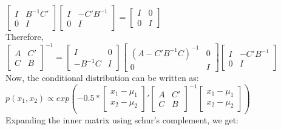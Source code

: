 \begin{enumerate}
{	$\begin{bmatrix}
	I & B^{-1}C' \\
	0 & I
	\end{bmatrix}
	\begin{bmatrix}
	I & -C'B^{-1} \\
	0 & I
	\end{bmatrix} =
	\begin{bmatrix}
	I & 0 \\
	0 & I
	\end{bmatrix}$\\

	Therefore, \\
	
	$\begin{bmatrix}
	A & C' \\
	C & B
	\end{bmatrix}^{-1}
	=
	\begin{bmatrix}
	I & 0 \\
	-B^{-1}C & I
	\end{bmatrix}
	\begin{bmatrix}
	(A - C'B^{-1}C)^{-1} & 0 \\
	0 & I
	\end{bmatrix}
	\begin{bmatrix}
	I & -C'B^{-1} \\
	0 & I
	\end{bmatrix}$\\

	Now, the conditional distribution can be written as:\\
	
	$p(x_{1}, x_{2}) \propto exp( -0.5 * 
	\begin{bmatrix}
	x_{1} - \mu_{1} \\
	x_{2} - \mu_{2} 
	\end{bmatrix}'
	\begin{bmatrix}
	A & C' \\
	C & B   
	\end{bmatrix}^{-1} 
	\begin{bmatrix}
	x_{1} - \mu_{1} \\
	x_{2} - \mu_{2} 
	\end{bmatrix} )$ \\

	Expanding the inner matrix using schur's complement, we get:\\

}
\end{enumerate}
